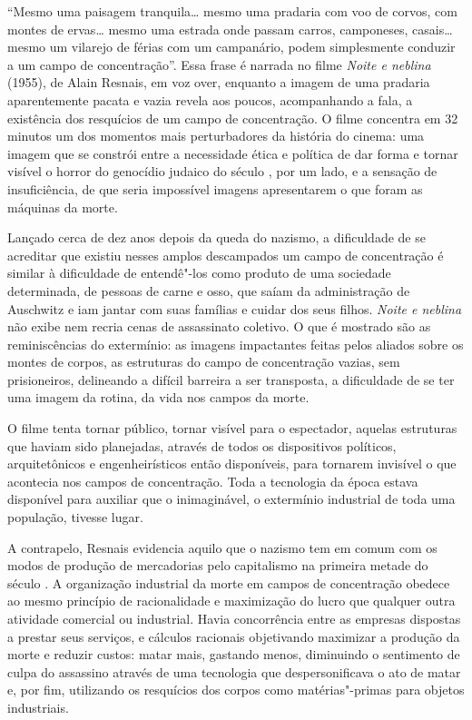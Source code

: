 \asterisc

``Mesmo uma paisagem tranquila\ldots{} mesmo uma pradaria com voo de corvos,
com montes de ervas\ldots{} mesmo uma estrada onde passam carros, camponeses,
casais\ldots{} mesmo um vilarejo de férias com um campanário, podem
simplesmente conduzir a um campo de concentração''. Essa frase é
narrada no filme \emph{Noite e neblina} (1955), de Alain Resnais, em voz over,
enquanto a imagem de uma pradaria aparentemente pacata e vazia revela
aos poucos, acompanhando a fala, a existência dos resquícios de um campo
de concentração. O filme concentra em 32 minutos um dos momentos mais
perturbadores da história do cinema: uma imagem que se constrói entre a
necessidade ética e política de dar forma e tornar visível o horror do
genocídio judaico do século , por um lado, e a sensação de
insuficiência, de que seria impossível imagens apresentarem o que foram as máquinas da morte.

Lançado cerca de dez anos depois da queda do nazismo, a dificuldade de
se acreditar que existiu nesses amplos descampados um campo de
concentração é similar à dificuldade de entendê"-los como produto de uma
sociedade determinada, de pessoas de carne e osso, que saíam da
administração de Auschwitz e iam jantar com suas famílias e cuidar dos
seus filhos. \emph{Noite e neblina} não exibe nem recria cenas de
assassinato coletivo. O que é mostrado são as reminiscências do
extermínio: as imagens impactantes feitas pelos aliados sobre os montes
de corpos, as estruturas do campo de concentração vazias, sem
prisioneiros, delineando a difícil barreira a ser transposta, a
dificuldade de se ter uma imagem da rotina, da vida nos campos da morte.

O filme tenta tornar público, tornar visível para o espectador, aquelas
estruturas que haviam sido planejadas, através de todos os dispositivos
políticos, arquitetônicos e engenheirísticos então disponíveis, para
tornarem invisível o que acontecia nos campos de concentração. Toda a
tecnologia da época estava disponível para auxiliar que o inimaginável,
o extermínio industrial de toda uma população, tivesse lugar.

A contrapelo, Resnais evidencia aquilo que o nazismo tem
em comum com os modos de produção de mercadorias pelo capitalismo na
primeira metade do século . A organização industrial da morte em
campos de concentração obedece ao mesmo princípio de racionalidade e
maximização do lucro que qualquer outra atividade comercial ou
industrial. Havia concorrência entre as empresas dispostas a prestar
seus serviços, e cálculos racionais objetivando maximizar a produção da
morte e reduzir custos: matar mais, gastando menos, diminuindo o
sentimento de culpa do assassino através de uma tecnologia que
despersonificava o ato de matar e, por fim, utilizando os resquícios dos
corpos como matérias"-primas para objetos industriais.

